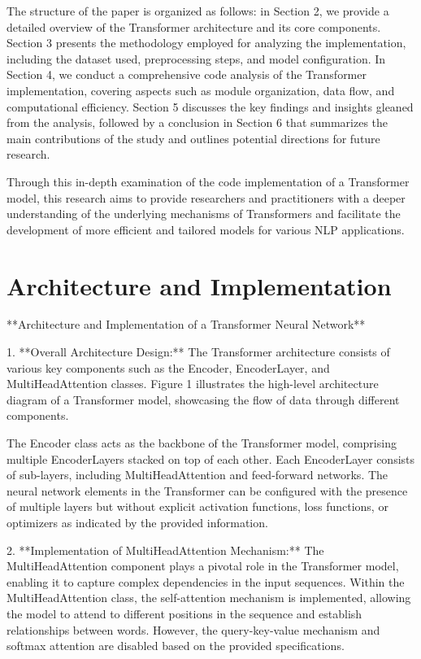 \documentclass[10pt,journal,compsoc]{IEEEtran}
\begin{document}
The structure of the paper is organized as follows: in Section 2, we provide a detailed overview of the Transformer architecture and its core components. Section 3 presents the methodology employed for analyzing the implementation, including the dataset used, preprocessing steps, and model configuration. In Section 4, we conduct a comprehensive code analysis of the Transformer implementation, covering aspects such as module organization, data flow, and computational efficiency. Section 5 discusses the key findings and insights gleaned from the analysis, followed by a conclusion in Section 6 that summarizes the main contributions of the study and outlines potential directions for future research.

Through this in-depth examination of the code implementation of a Transformer model, this research aims to provide researchers and practitioners with a deeper understanding of the underlying mechanisms of Transformers and facilitate the development of more efficient and tailored models for various NLP applications.

\section{Architecture and Implementation}
**Architecture and Implementation of a Transformer Neural Network**

1. **Overall Architecture Design:**
The Transformer architecture consists of various key components such as the Encoder, EncoderLayer, and MultiHeadAttention classes. Figure 1 illustrates the high-level architecture diagram of a Transformer model, showcasing the flow of data through different components.

The Encoder class acts as the backbone of the Transformer model, comprising multiple EncoderLayers stacked on top of each other. Each EncoderLayer consists of sub-layers, including MultiHeadAttention and feed-forward networks. The neural network elements in the Transformer can be configured with the presence of multiple layers but without explicit activation functions, loss functions, or optimizers as indicated by the provided information.

2. **Implementation of MultiHeadAttention Mechanism:**
The MultiHeadAttention component plays a pivotal role in the Transformer model, enabling it to capture complex dependencies in the input sequences. Within the MultiHeadAttention class, the self-attention mechanism is implemented, allowing the model to attend to different positions in the sequence and establish relationships between words. However, the query-key-value mechanism and softmax attention are disabled based on the provided specifications.
\end{document}
